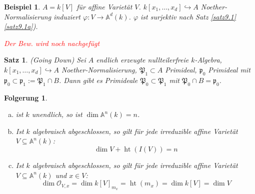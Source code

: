 \documentclass[a4paper, 12pt, numbers=noendperiod, chapterprefix=true]{scrbook}
\theoremstyle{break}
\newtheorem{UnterSatz}{Satz}[Satz]
\newtheorem{Folg}[Def]{Folgerung}
\theoremstyle{nonumberbreak}
\newtheorem{nnBsp}{Beispiel}
\theoremstyle{nonumberplain}
\newcommand{\quot}[1]{\textrm{\glqq}{#1}\textrm{\grqq}}
\DeclareMathOperator{\Ht}{ht}
\newcommand{\A}{\mathbb{A}}
\newcommand{\calO}{\mathcal{O}}
\begin{document}
\begin{nnBsp}
$A=k[V]$ f\"ur affine Variet\"at $V$. $k[x_1,\ldots ,x_d] \hookrightarrow A$ Noether-Normalisierung induziert $\varphi:V\to\A^d(k)$. $\varphi$ ist surjektiv nach Satz \ref{satz9.1} \ref{satz9.1a}).

\textcolor{red}{Der Bew. wird noch nachgef\"ugt}
\end{nnBsp}

\begin{UnterSatz}
(\quot{Going Down}) Sei $A$ endlich erzeugte nullteilerfreie $k$-Algebra, $k[x_1,\ldots ,x_d]\hookrightarrow A$ Noether-Normalisierung, $\mathfrak P_1\subset A$ Primideal, $\mathfrak p_0$ Primideal mit $\mathfrak p_0 \subset \mathfrak p_1 := \mathfrak P_1\cap B$. Dann gibt es Primideale $\mathfrak P_0\subset \mathfrak P_1$ mit $\mathfrak P_0\cap B=\mathfrak p_0$.
\begin{center}\end{center}
\end{UnterSatz}

\begin{Folg}\label{folg18.5}\begin{enumerate}[a)]
\item
	ist $k$ unendlich, so ist $\dim\A^n(k)=n$.
\item\label{folg18.5b}
	Ist $k$ algebraisch abgeschlossen, so gilt f\"ur jede irreduzible affine Variet\"at $V\subseteq\A^n(k)$:
		\[\dim V + \Ht(I(V))=n\]
\item\label{folg18.5c}
	Ist $k$ algebraisch abgeschlossen, so gilt f\"ur jede irreduzible affine Variet\"at $V\subseteq\A^n(k)$ und $x\in V$:
		\[\dim\calO_{V,x}=\dim k[V]_{m_x}=\Ht(m_x)=\dim k[V]=\dim V\]
\end{enumerate}\end{Folg}
\end{document}
